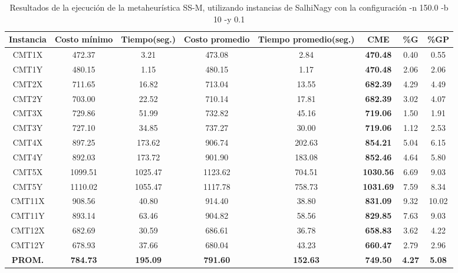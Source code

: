 \begin{table}[h]
\caption{Resultados de la ejecución de la metaheurística SS-M, utilizando instancias de SalhiNagy con la configuración -n 150.0 -b 10 -y 0.1}
\centering
\small
\begin{tabular}{c c c c c c c c}
\hline\hline
Instancia & Costo mínimo & Tiempo(seg.) & Costo promedio & Tiempo promedio(seg.) & CME & \%G & \%GP \\ [0.5ex]
\hline
CMT1X & 472.37 & 3.21 & 
473.08 & 2.84 & \bf{470.48} & 
0.40 & 0.55\\CMT1Y & 480.15 & 1.15 & 
480.15 & 1.17 & \bf{470.48} & 
2.06 & 2.06\\CMT2X & 711.65 & 16.82 & 
713.04 & 13.55 & \bf{682.39} & 
4.29 & 4.49\\CMT2Y & 703.00 & 22.52 & 
710.14 & 17.81 & \bf{682.39} & 
3.02 & 4.07\\CMT3X & 729.86 & 51.99 & 
732.82 & 45.16 & \bf{719.06} & 
1.50 & 1.91\\CMT3Y & 727.10 & 34.85 & 
737.27 & 30.00 & \bf{719.06} & 
1.12 & 2.53\\CMT4X & 897.25 & 173.62 & 
906.74 & 202.63 & \bf{854.21} & 
5.04 & 6.15\\CMT4Y & 892.03 & 173.72 & 
901.90 & 183.08 & \bf{852.46} & 
4.64 & 5.80\\CMT5X & 1099.51 & 1025.47 & 
1123.62 & 704.51 & \bf{1030.56} & 
6.69 & 9.03\\CMT5Y & 1110.02 & 1055.47 & 
1117.78 & 758.73 & \bf{1031.69} & 
7.59 & 8.34\\CMT11X & 908.56 & 40.80 & 
914.40 & 38.80 & \bf{831.09} & 
9.32 & 10.02\\CMT11Y & 893.14 & 63.46 & 
904.82 & 58.56 & \bf{829.85} & 
7.63 & 9.03\\CMT12X & 682.69 & 30.59 & 
686.61 & 36.78 & \bf{658.83} & 
3.62 & 4.22\\CMT12Y & 678.93 & 37.66 & 
680.04 & 43.23 & \bf{660.47} & 
2.79 & 2.96\\\bf{PROM.} & 
\bf{784.73} & \bf{195.09} & \bf{791.60} & \bf{152.63} & \bf{749.50} & \bf{4.27} & \bf{5.08}\\[1ex]\hline
\end{tabular}
\label{table:SS-M-150-0.1-S}
\end{table}

